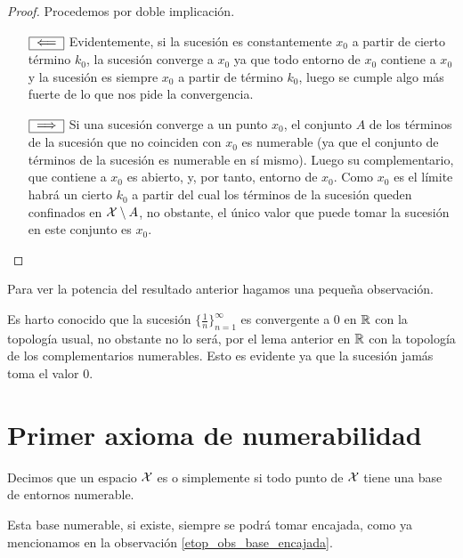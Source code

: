 \begin{proof}Procedemos por doble implicación.
	\begin{enumerate}
		\item[$\fbox{$\impliedby$}$] 
		Evidentemente, si la sucesión es constantemente $x_0$ a partir de cierto término $k_0$, la sucesión converge a $x_0$ ya que todo entorno de $x_0$ contiene a $x_0$ y la sucesión es siempre $x_0$ a partir de término $k_0$, luego se cumple algo más fuerte de lo que nos pide la convergencia.
		\item[$\fbox{$\implies$}$]
		Si una sucesión converge a un punto $x_0$, el conjunto $A$ de los términos de la sucesión que no coinciden con $x_0$ es numerable (ya que el conjunto de términos de la sucesión es numerable en sí mismo). Luego su complementario, que contiene a $x_0$ es abierto, y, por tanto, entorno de $x_0$. Como $x_0$ es el límite habrá un cierto $k_0$ a partir del cual los términos de la sucesión queden confinados en $\mathcal{X}\setminus A$, no obstante, el único valor que puede tomar la sucesión en este conjunto es $x_0$.\qedhere
	\end{enumerate}
\end{proof}
Para ver la potencia del resultado anterior hagamos una pequeña observación.
\begin{obs}
	Es harto conocido que la sucesión $\{\frac{1}{n}\}_{n=1}^{\infty}$ es convergente a $0$ en $\mathbb{R}$ con la topología usual, no obstante no lo será, por el lema anterior en $\mathbb{R}$ con la topología de los complementarios numerables. Esto es evidente ya que la sucesión jamás toma el valor $0$.
\end{obs}
\section{Primer axioma de numerabilidad}

\begin{defi}
	Decimos que un espacio $\mathcal{X}$ es  o simplemente  si todo punto de $\mathcal{X}$ tiene una base de entornos numerable.
\end{defi}

\begin{obs}
	Esta base numerable, si existe, siempre se podrá tomar encajada, como ya mencionamos en la observación \ref{etop_obs_base_encajada}. 
\end{obs}

